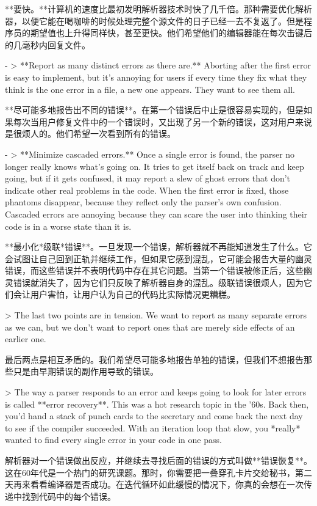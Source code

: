 \documentclass[cn,11pt,chinese]{elegantbook}
\begin{document}
  **要快。**计算机的速度比最初发明解析器技术时快了几千倍。那种需要优化解析器，以便它能在喝咖啡的时候处理完整个源文件的日子已经一去不复返了。但是程序员的期望值也上升得同样快，甚至更快。他们希望他们的编辑器能在每次击键后的几毫秒内回复文件。

- > **Report as many distinct errors as there are.** Aborting after the first error is easy to implement, but it’s annoying for users if every time they fix what they think is the one error in a file, a new one appears. They want to see them all.

  **尽可能多地报告出不同的错误**。在第一个错误后中止是很容易实现的，但是如果每次当用户修复文件中的一个错误时，又出现了另一个新的错误，这对用户来说是很烦人的。他们希望一次看到所有的错误。

- > **Minimize \*cascaded\* errors.** Once a single error is found, the parser no longer really knows what’s going on. It tries to get itself back on track and keep going, but if it gets confused, it may report a slew of ghost errors that don’t indicate other real problems in the code. When the first error is fixed, those phantoms disappear, because they reflect only the parser’s own confusion. Cascaded errors are annoying because they can scare the user into thinking their code is in a worse state than it is.

  **最小化*级联*错误**。一旦发现一个错误，解析器就不再能知道发生了什么。它会试图让自己回到正轨并继续工作，但如果它感到混乱，它可能会报告大量的幽灵错误，而这些错误并不表明代码中存在其它问题。当第一个错误被修正后，这些幽灵错误就消失了，因为它们只反映了解析器自身的混乱。级联错误很烦人，因为它们会让用户害怕，让用户认为自己的代码比实际情况更糟糕。

> The last two points are in tension. We want to report as many separate errors as we can, but we don’t want to report ones that are merely side effects of an earlier one.

最后两点是相互矛盾的。我们希望尽可能多地报告单独的错误，但我们不想报告那些只是由早期错误的副作用导致的错误。

> The way a parser responds to an error and keeps going to look for later errors is called **error recovery**. This was a hot research topic in the ’60s. Back then, you’d hand a stack of punch cards to the secretary and come back the next day to see if the compiler succeeded. With an iteration loop that slow, you *really* wanted to find every single error in your code in one pass.

解析器对一个错误做出反应，并继续去寻找后面的错误的方式叫做**错误恢复**。这在60年代是一个热门的研究课题。那时，你需要把一叠穿孔卡片交给秘书，第二天再来看看编译器是否成功。在迭代循环如此缓慢的情况下，你真的会想在一次传递中找到代码中的每个错误。
\end{document}
